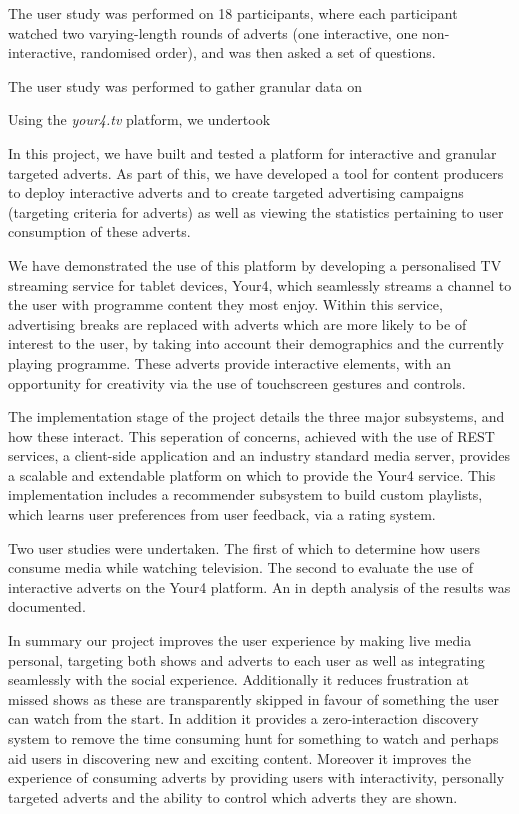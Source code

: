 The user study was performed on 18 participants, where each participant watched two varying-length rounds of adverts (one interactive, one non-interactive, randomised order), and was then asked a set of questions.

The user study was performed to gather granular data on 

Using the \textit{your4.tv} platform, we undertook 

In this project, we have built and tested a platform for interactive and granular targeted adverts. As part of this, we have developed a tool for content producers to deploy interactive adverts and to create targeted advertising campaigns (targeting criteria for adverts) as well as viewing the statistics pertaining to user consumption of these adverts.

We have demonstrated the use of this platform by developing a personalised TV streaming service for tablet devices, Your4, which seamlessly streams a channel to the user with programme content they most enjoy. Within this service, advertising breaks are replaced with adverts which are more likely to be of interest to the user, by taking into account their demographics and the currently playing programme. These adverts provide interactive elements, with an opportunity for creativity via the use of touchscreen gestures and controls.

The implementation stage of the project details the three major subsystems, and how these interact. This seperation of concerns, achieved with the use of REST services, a client-side application and an industry standard media server, provides a scalable and extendable platform on which to provide the Your4 service. This implementation includes a recommender subsystem to build custom playlists, which learns user preferences from user feedback, via a rating system.

Two user studies were undertaken. The first of which to determine how users consume media while watching television. The second to evaluate the use of interactive adverts on the Your4 platform. An in depth analysis of the results was documented.



In summary our project improves the user experience by making live media personal, targeting both shows and adverts to each user as well as integrating seamlessly with the social experience. Additionally it reduces frustration at missed shows as these are transparently skipped in favour of something the user can watch from the start. In addition it provides a zero-interaction discovery system to remove the time consuming hunt for something to watch and perhaps aid users in discovering new and exciting content. Moreover it improves the experience of consuming adverts by providing users with interactivity, personally targeted adverts and the ability to control which adverts they are shown. 
